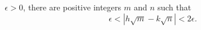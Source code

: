 $\epsilon > 0$, there are positive integers $m$ and $n$ such that
\[ \epsilon < |h \sqrt{m} - k \sqrt{n}| < 2\epsilon.  \]
